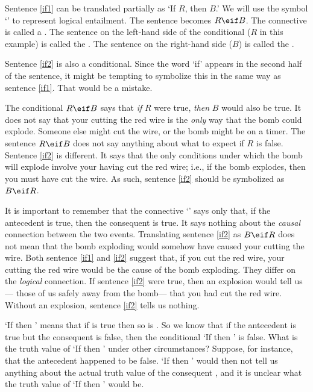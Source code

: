 Sentence \ref{if1} can be translated partially as `If $R$, then $B$.' We will use the symbol `\eif' to represent logical {entailment}. The sentence becomes $R\eif B$. The connective is called a . The sentence on the left-hand side of the conditional ($R$ in this example) is called the . The sentence on the right-hand side ($B$) is called the .

Sentence \ref{if2} is also a conditional. Since the word `if' appears in the second half of the sentence, it might be tempting to symbolize this in the same way as sentence \ref{if1}. That would be a mistake.

The conditional $R\eif B$ says that \emph{if} $R$ were true, \emph{then} $B$ would also be true. It does not say that your cutting the red wire is the \emph{only} way that the bomb could explode. Someone else might cut the wire, or the bomb might be on a timer. The sentence $R\eif B$ does not say anything about 
what to expect if $R$ is false. Sentence \ref{if2} is different. It says that the only conditions under which the bomb will explode involve your having cut the red wire; i.e., if the bomb explodes, then you must have cut the wire. As such, sentence \ref{if2} should be symbolized as $B \eif R$.

It is important to remember that the connective `\eif' says only that, if the antecedent is true, then the consequent is true. It says nothing about the \emph{causal} connection between the two events. Translating sentence \ref{if2} as $B \eif R$ does not mean that the bomb exploding would somehow have caused your cutting the wire. Both sentence \ref{if1} and \ref{if2} suggest that, if you cut the red wire, your cutting the red wire would be the cause of the bomb exploding. They differ on the \emph{logical} connection. If sentence \ref{if2} were true, then an explosion would tell us--- those of us safely away from the bomb--- that you had cut the red wire. Without an explosion, sentence \ref{if2} tells us nothing.



`If  then ' means that if  is true then so is . So we know that if the antecedent  is true but the consequent  is false, then the conditional `If  then ' is false. What is the truth value of `If  then ' under other circumstances? Suppose, for instance, that the antecedent  happened to be false. `If  then ' would then not tell us anything about the actual truth value of the consequent , and it is unclear what the truth value of `If  then ' would be.

